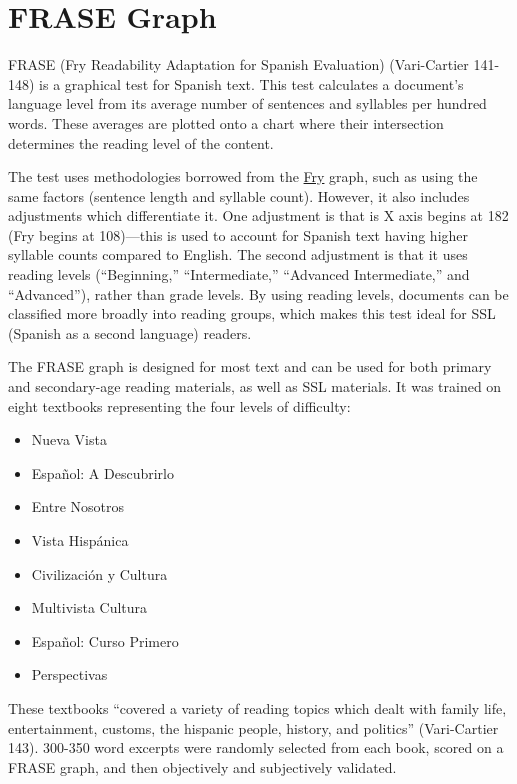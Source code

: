 \documentclass[
]{book}
\providecommand{\tightlist}{%
  \setlength{\itemsep}{0pt}\setlength{\parskip}{0pt}}
\theoremstyle{definition}
\theoremstyle{definition}
\theoremstyle{definition}
\theoremstyle{definition}
\theoremstyle{remark}
\begin{document}
\hypertarget{frase}{%
\section{\texorpdfstring{FRASE Graph}{FRASE Graph}}\label{frase}}

FRASE (Fry Readability Adaptation for Spanish Evaluation) (Vari-Cartier 141-148) is a graphical test for Spanish text. This test calculates a document's language level from its average number of sentences and syllables per hundred words. These averages are plotted onto a chart where their intersection determines the reading level of the content.

The test uses methodologies borrowed from the \protect\hyperlink{fry-test}{Fry} graph, such as using the same factors (sentence length and syllable count). However, it also includes adjustments which differentiate it. One adjustment is that is X axis begins at 182 (Fry begins at 108)---this is used to account for Spanish text having higher syllable counts compared to English. The second adjustment is that it uses reading levels (``Beginning,'' ``Intermediate,'' ``Advanced Intermediate,'' and ``Advanced''), rather than grade levels. By using reading levels, documents can be classified more broadly into reading groups, which makes this test ideal for SSL (Spanish as a second language) readers.

The FRASE graph is designed for most text and can be used for both primary and secondary-age reading materials, as well as SSL materials. It was trained on eight textbooks representing the four levels of difficulty:

\begin{itemize}
\tightlist
\item
  Nueva Vista
\item
  Español: A Descubrirlo
\item
  Entre Nosotros
\item
  Vista Hispánica
\item
  Civilización y Cultura
\item
  Multivista Cultura
\item
  Español: Curso Primero
\item
  Perspectivas
\end{itemize}

These textbooks ``covered a variety of reading topics which dealt with family life, entertainment, customs, the hispanic people, history, and politics'' (Vari-Cartier 143). 300-350 word excerpts were randomly selected from each book, scored on a FRASE graph, and then objectively and subjectively validated.
\end{document}
